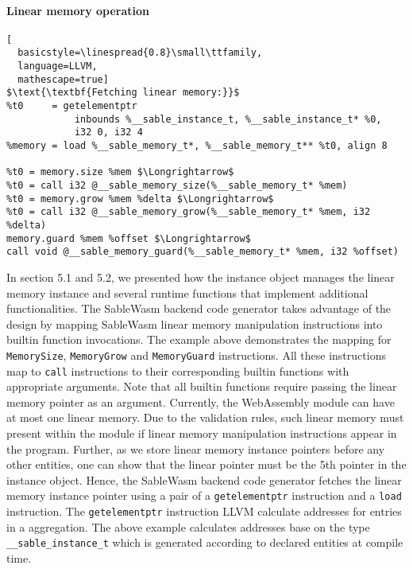 \paragraph{Linear memory operation} \quad
\begin{lstlisting}[
  basicstyle=\linespread{0.8}\small\ttfamily, 
  language=LLVM, 
  mathescape=true]
$\text{\textbf{Fetching linear memory:}}$
%t0     = getelementptr 
            inbounds %__sable_instance_t, %__sable_instance_t* %0, 
            i32 0, i32 4
%memory = load %__sable_memory_t*, %__sable_memory_t** %t0, align 8

%t0 = memory.size %mem $\Longrightarrow$
%t0 = call i32 @__sable_memory_size(%__sable_memory_t* %mem)
%t0 = memory.grow %mem %delta $\Longrightarrow$
%t0 = call i32 @__sable_memory_grow(%__sable_memory_t* %mem, i32 %delta)
memory.guard %mem %offset $\Longrightarrow$
call void @__sable_memory_guard(%__sable_memory_t* %mem, i32 %offset)
\end{lstlisting}
In section 5.1 and 5.2, we presented how the instance object manages the linear
memory instance and several runtime functions that implement additional
functionalities. The SableWasm backend code generator takes advantage of the
design by mapping SableWasm linear memory manipulation instructions into builtin
function invocations. The example above demonstrates the mapping for
\texttt{MemorySize}, \texttt{MemoryGrow} and \texttt{MemoryGuard} instructions.
All these instructions map to \texttt{call} instructions to their corresponding
builtin functions with appropriate arguments. Note that all builtin functions
require passing the linear memory pointer as an argument. Currently, the
WebAssembly module can have at most one linear memory. Due to the validation
rules, such linear memory must present within the module if linear memory
manipulation instructions appear in the program. Further, as we store linear
memory instance pointers before any other entities, one can show that the
linear pointer must be the 5th pointer in the instance object. Hence, the
SableWasm backend code generator fetches the linear memory instance pointer
using a pair of a \texttt{getelementptr} instruction and a \texttt{load}
instruction. The \texttt{getelementptr} instruction LLVM calculate addresses
for entries in a aggregation. The above example calculates addresses base on
the type \texttt{\_\_sable\_instance\_t} which is generated according to
declared entities at compile time.

